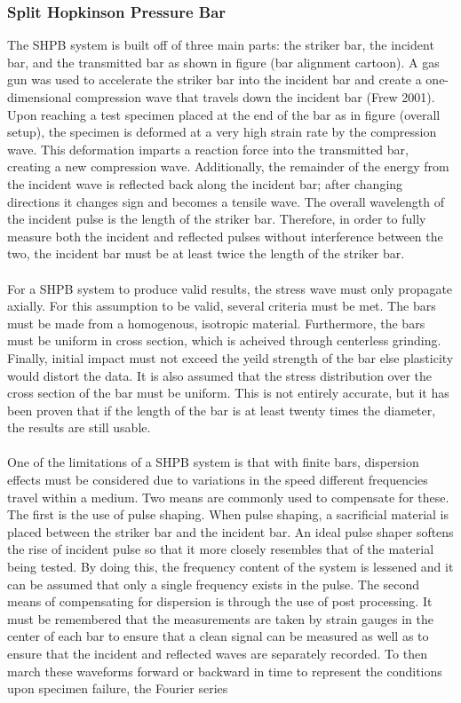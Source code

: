 \documentclass[12pt]{article}
\begin{document}
\subsubsection {Split Hopkinson Pressure Bar} %
The SHPB system is built off of three main parts: the striker bar, the incident bar, and the transmitted bar as shown in figure (bar alignment cartoon). A gas gun was used to accelerate the striker bar into the incident bar and create a one-dimensional compression wave that travels down the incident bar (Frew 2001). Upon reaching a test specimen placed at the end of the bar as in figure (overall setup), the specimen is deformed at a very high strain rate by the compression wave. This deformation imparts a reaction force into the transmitted bar, creating a new compression wave. Additionally, the remainder of the energy from the incident wave is reflected back along the incident bar; after changing directions it changes sign and becomes a tensile wave. The overall wavelength of the incident pulse is the length of the striker bar. Therefore, in order to fully measure both the incident and reflected pulses without interference between the two, the incident bar must be at least twice the length of the striker bar.
\\ \\
For a SHPB system to produce valid results, the stress wave must only propagate axially. For this assumption to be valid, several criteria must be met. The bars must be made from a homogenous, isotropic material. Furthermore, the bars must be uniform in cross section, which is acheived through centerless grinding. Finally, initial impact must not exceed the yeild strength of the bar else plasticity would distort the data. It is also assumed that the stress distribution over the cross section of the bar must be uniform. This is not entirely accurate, but it has been proven that if the length of the bar is at least twenty times the diameter, the results are still usable. 
\\ \\
One of the limitations of a SHPB system is that with finite bars, dispersion effects must be considered due to variations in the speed different frequencies travel within a medium. Two means are commonly used to compensate for these. The first is the use of pulse shaping. When pulse shaping, a sacrificial material is placed between the striker bar and the incident bar. An ideal pulse shaper softens the rise of incident pulse so that it more closely resembles that of the material being tested. By doing this, the frequency content of the system is lessened and it can be assumed that only a single frequency exists in the pulse. The second means of compensating for dispersion is through the use of post processing. It must be remembered that the measurements are taken by strain gauges in the center of each bar to ensure that a clean signal can be measured as well as to ensure that the incident and reflected waves are separately recorded. To then march these waveforms forward or backward in time to represent the conditions upon specimen failure, the Fourier series
\end{document}
